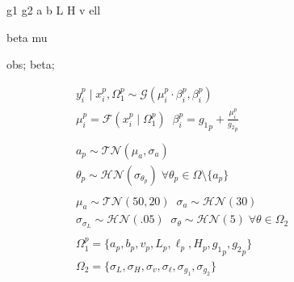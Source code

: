 \documentclass[a4paper,12pt]{article}
\begin{document}
\begin{minipage}{.5\textwidth}
\begin{figure}[H]
{            %

             {g1}
             {g2}
             {a}
             {b}
             {L}
             {H}
             {v}
             {ell}

             {beta}
             {mu}

             {obs};
             {beta};
        }
    \end{figure}
\end{minipage}
\begin{minipage}{.6\textwidth}
    \begin{align*}
        &y_i^p \mid x_i^p, \Omega_1^p \sim \mathcal{G}\left(\mu_i^p\cdot\beta_i^p, \beta_i^p\right) \\
        &\mu_i^p = \mathcal{F}\left(x_i^p \mid \Omega_1^p\right) \;\; \beta_i^p = {g_1}_p + \frac{\mu_i^p}{{g_2}_p}\\\\
        &a_p \sim \mathcal{TN}\left(\mu_a, \sigma_a\right)\\
        &\theta_p \sim \mathcal{HN}\left(\sigma_{\theta_p}\right) \; \forall \theta_p \in \Omega \setminus \{a_p\}\\\\
        & \mu_a \sim \mathcal{TN}\left(50, 20\right)\;\; \sigma_a \sim \mathcal{HN}\left(30\right)\\
        &\sigma_{\sigma_L} \sim \mathcal{HN}\left(.05\right) \;\; \sigma_\theta \sim \mathcal{HN}\left(5\right) \;\forall \theta \in \Omega_2\\\\
        &\Omega_1^p = \{ a_p, b_p, v_p, L_p, \ell_p, H_p, {g_1}_p, {g_2}_p\}\\
        &\Omega_2 = \{\sigma_{L}, \sigma_{H}, \sigma_{v}, \sigma_{\ell}, \sigma_{g_1}, \sigma_{g_2}\}
    \end{align*}
\end{minipage}
\end{document}

